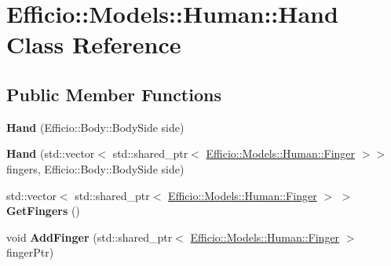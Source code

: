 \hypertarget{class_efficio_1_1_models_1_1_human_1_1_hand}{}\section{Efficio\+:\+:Models\+:\+:Human\+:\+:Hand Class Reference}
\label{class_efficio_1_1_models_1_1_human_1_1_hand}
\subsection*{Public Member Functions}
\begin{DoxyCompactItemize}
\item 
{\bfseries Hand} (Efficio\+::\+Body\+::\+Body\+Side side)\hypertarget{class_efficio_1_1_models_1_1_human_1_1_hand_a7cc7ba47701e6ad669cb06ac8e5549f5}{}\label{class_efficio_1_1_models_1_1_human_1_1_hand_a7cc7ba47701e6ad669cb06ac8e5549f5}

\item 
{\bfseries Hand} (std\+::vector$<$ std\+::shared\+\_\+ptr$<$ \hyperlink{class_efficio_1_1_models_1_1_human_1_1_finger}{Efficio\+::\+Models\+::\+Human\+::\+Finger} $>$$>$ fingers, Efficio\+::\+Body\+::\+Body\+Side side)\hypertarget{class_efficio_1_1_models_1_1_human_1_1_hand_a046fa143e18b8b5044696a8762b15a74}{}\label{class_efficio_1_1_models_1_1_human_1_1_hand_a046fa143e18b8b5044696a8762b15a74}

\item 
std\+::vector$<$ std\+::shared\+\_\+ptr$<$ \hyperlink{class_efficio_1_1_models_1_1_human_1_1_finger}{Efficio\+::\+Models\+::\+Human\+::\+Finger} $>$ $>$ {\bfseries Get\+Fingers} ()\hypertarget{class_efficio_1_1_models_1_1_human_1_1_hand_ae0879a96d41d0358fe6e87b57fa3aa54}{}\label{class_efficio_1_1_models_1_1_human_1_1_hand_ae0879a96d41d0358fe6e87b57fa3aa54}

\item 
void {\bfseries Add\+Finger} (std\+::shared\+\_\+ptr$<$ \hyperlink{class_efficio_1_1_models_1_1_human_1_1_finger}{Efficio\+::\+Models\+::\+Human\+::\+Finger} $>$ finger\+Ptr)\hypertarget{class_efficio_1_1_models_1_1_human_1_1_hand_af576c038ebf2e134c0110eaf93208b68}{}\label{class_efficio_1_1_models_1_1_human_1_1_hand_af576c038ebf2e134c0110eaf93208b68}

\end{DoxyCompactItemize}
